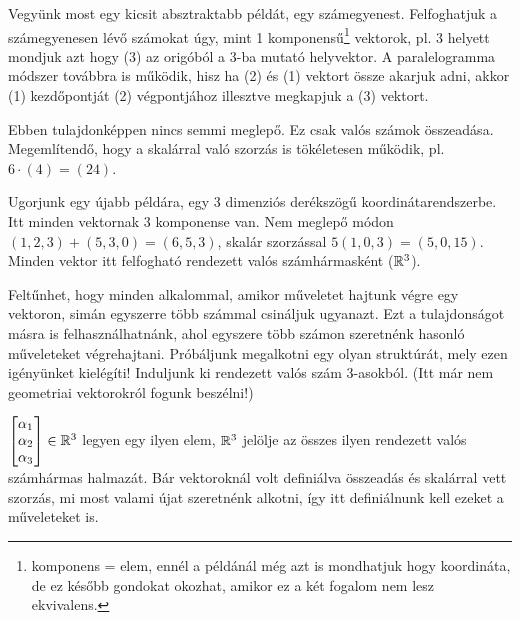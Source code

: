 \documentclass[a4paper,11.5pt]{article}
\begin{document}
	Vegyünk most egy kicsit absztraktabb példát, egy számegyenest. Felfoghatjuk a számegyenesen lévő számokat úgy, mint 1 komponensű\footnote{komponens = elem, ennél a példánál még azt is mondhatjuk hogy koordináta, de ez később gondokat okozhat, amikor ez a két fogalom nem lesz ekvivalens.} vektorok, pl. 3 helyett mondjuk azt hogy (3) az origóból a 3-ba mutató helyvektor. A paralelogramma módszer továbbra is működik, hisz ha (2) és (1) vektort össze akarjuk adni, akkor (1) kezdőpontját (2) végpontjához illesztve megkapjuk a (3) vektort. 
	
	Ebben tulajdonképpen nincs semmi meglepő. Ez csak valós számok összeadása. Megemlítendő, hogy a skalárral való szorzás is tökéletesen működik, pl. $6\cdot(4)=(24)$.
	
	Ugorjunk egy újabb példára, egy 3 dimenziós derékszögű koordinátarendszerbe. Itt minden vektornak 3 komponense van. Nem meglepő módon $(1,2,3)+(5,3,0)=(6,5,3)$, skalár szorzással $5(1,0,3)=(5,0,15)$. Minden vektor itt felfogható rendezett valós számhármasként ($\mathbb{R}^3$).
	
	\medskip
	Feltűnhet, hogy minden alkalommal, amikor műveletet hajtunk végre egy vektoron, simán egyszerre több számmal csináljuk ugyanazt. Ezt a tulajdonságot másra is felhasználhatnánk, ahol egyszere több számon szeretnénk hasonló műveleteket végrehajtani. Próbáljunk megalkotni egy olyan struktúrát, mely ezen igényünket kielégíti! Induljunk ki rendezett valós szám 3-asokból. (Itt már nem geometriai vektorokról fogunk beszélni!)
	
	$\begin{bmatrix}
		\alpha_1 \s\\
		\alpha_2\s \\
		\alpha_3\s \\
	\end{bmatrix} \in \R^3$ legyen egy ilyen elem, $\mathbb{R}^3$ jelölje az összes ilyen rendezett valós számhármas halmazát. Bár vektoroknál volt definiálva összeadás és skalárral vett szorzás, mi most valami újat szeretnénk alkotni, így itt definiálnunk kell ezeket a műveleteket is.
	
\end{document}

